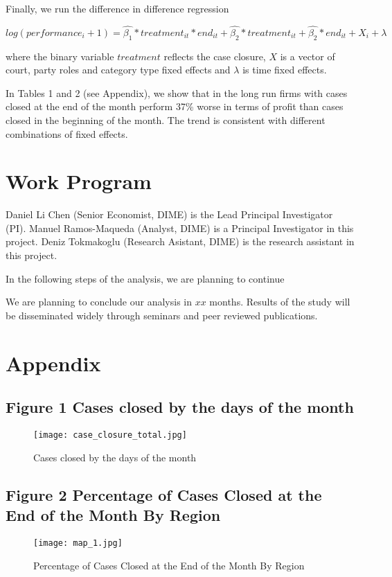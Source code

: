 \documentclass[12pt]{article}
\begin{document}
Finally, we run the difference in difference regression 

$$ log(performance_i + 1) = \hat{\beta_1} * treatment_{it} * end_{it} + \hat{\beta_2}*treatment_{it} + \hat{\beta_2} * end_{it} + X_i + \lambda $$ 

where the binary variable $treatment$ reflects the case closure, $X$ is a vector of court, party roles and category type fixed effects and $\lambda$ is time fixed effects.

In Tables 1 and 2 (see Appendix), we show that in the long run firms with cases closed at the end of the month perform 37\% worse in terms of profit than cases closed in the beginning of the month. The trend is consistent with different combinations of fixed effects. 

\section{Work Program}
Daniel Li Chen (Senior Economist, DIME) is the Lead Principal Investigator (PI). Manuel Ramos-Maqueda (Analyst, DIME) is a Principal Investigator in this project. Deniz Tokmakoglu (Research Asistant, DIME) is the research assistant in this project. 

In the following steps of the analysis, we are planning to continue 

We are planning to conclude our analysis in $xx$ months. Results of the study will be disseminated widely through seminars and peer reviewed publications.

\section{Appendix}
\label{sec:verify}

\subsection{Figure 1 Cases closed by the days of the month}
\begin{figure}[H]
\label{fig:figure1}
    \centering
    \texttt{[image: case\_closure\_total.jpg]}
    \caption{Cases closed by the days of the month}
\end{figure}

\subsection{Figure 2 Percentage of Cases Closed at the End of the Month By Region}
\begin{figure}[H]
  \label{fig:figure2}
    \centering
    \texttt{[image: map\_1.jpg]}
    \caption{Percentage of Cases Closed at the End of the Month By Region}
\end{figure}
\end{document}
